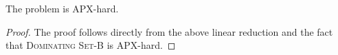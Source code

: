 \begin{theorem}
The \textsc{\CARPOOL{}} problem is APX-hard.
\end{theorem}

\begin{proof}
The proof follows directly from the above linear reduction and the fact that 
\textsc{Dominating Set-B} is APX-hard. 
\end{proof}